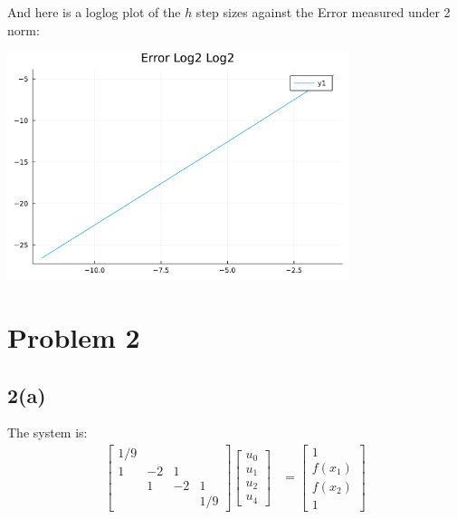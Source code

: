 \documentclass[]{article}
\begin{document}
    And here is a loglog plot of the $h$ step sizes against the Error measured under 2 norm: 
    \begin{center}
        \includegraphics[width=10cm]{errorloglog.png}    
    \end{center}
    

\section*{Problem 2}
    \subsection*{2(a)}
        The system is: 
        \begin{align*}\tag{2.a.1}\label{eqn:2.a.1}
            \begin{bmatrix}
                1/9 & & & \\
                1 & - 2 & 1 & \\
                & 1 & -2 & 1 \\ 
                & & & 1/9
            \end{bmatrix}
            \begin{bmatrix}
                u_0 \\ u_1 \\ u_2 \\ u_4
            \end{bmatrix}
            &= 
            \begin{bmatrix}
                1 \\ f(x_1) \\ f(x_2) \\ 1
            \end{bmatrix}
        \end{align*}
\end{document}

